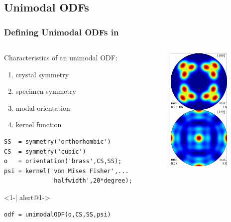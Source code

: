 \subsection*{Unimodal ODFs}

\begin{frame}[fragile]
  \frametitle{Defining Unimodal ODFs in \MTEX}

  \begin{columns}

    \begin{column}{8.5cm}

      Characteristics of an unimodal ODF:
      \begin{enumerate}
      \item crystal symmetry
      \item specimen symmetry
      \item modal orientation
      \item kernel function
      \end{enumerate}



\begin{lstlisting}
SS  = symmetry('orthorhombic')
CS  = symmetry('cubic')
o   = orientation('brass',CS,SS);
psi = kernel('von Mises Fisher',...
             'halfwidth',20*degree);
\end{lstlisting}

      \begin{actionenv}<1-| alert@1->
\begin{lstlisting}
odf = unimodalODF(o,CS,SS,psi)
\end{lstlisting}
    \end{actionenv}

\end{column}

    \begin{column}{3cm}
      \includegraphics[width=3cm]{pic/unimodalODF}
    \end{column}
  \end{columns}

\end{frame}



